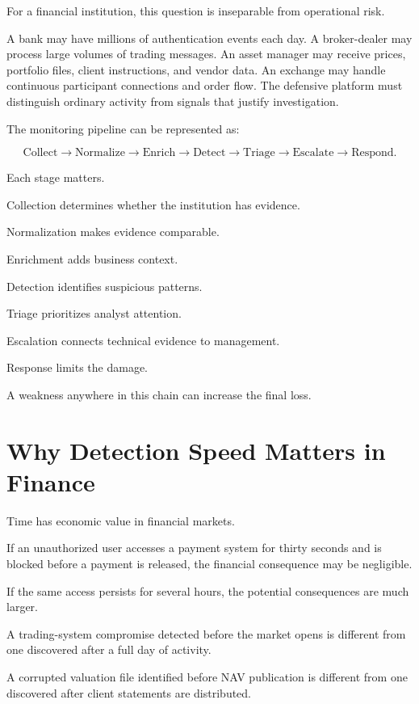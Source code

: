 For a financial institution, this question is inseparable from operational risk.

A bank may have millions of authentication events each day. A broker-dealer may process large volumes of trading messages. An asset manager may receive prices, portfolio files, client instructions, and vendor data. An exchange may handle continuous participant connections and order flow. The defensive platform must distinguish ordinary activity from signals that justify investigation.

The monitoring pipeline can be represented as:

\begin{equation}
\text{Collect}
\rightarrow
\text{Normalize}
\rightarrow
\text{Enrich}
\rightarrow
\text{Detect}
\rightarrow
\text{Triage}
\rightarrow
\text{Escalate}
\rightarrow
\text{Respond}.
\end{equation}

Each stage matters.

Collection determines whether the institution has evidence.

Normalization makes evidence comparable.

Enrichment adds business context.

Detection identifies suspicious patterns.

Triage prioritizes analyst attention.

Escalation connects technical evidence to management.

Response limits the damage.

A weakness anywhere in this chain can increase the final loss.

\section{Why Detection Speed Matters in Finance}

Time has economic value in financial markets.

If an unauthorized user accesses a payment system for thirty seconds and is blocked before a payment is released, the financial consequence may be negligible.

If the same access persists for several hours, the potential consequences are much larger.

A trading-system compromise detected before the market opens is different from one discovered after a full day of activity.

A corrupted valuation file identified before NAV publication is different from one discovered after client statements are distributed.

